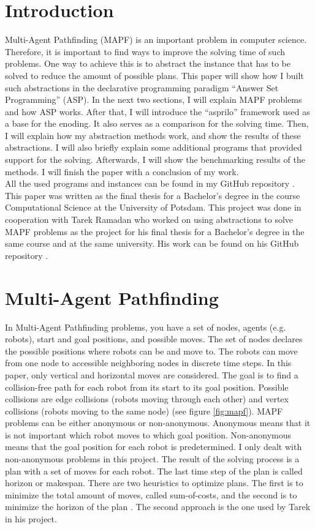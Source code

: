 \documentclass[runningheads]{llncs}
\begin{document}
\section{Introduction}
Multi-Agent Pathfinding (MAPF) is an important problem in computer science. Therefore, it is important to find ways to improve the solving time of such problems. One way to achieve this is to abstract the instance that has to be solved to reduce the amount of
possible plans. This paper will show how I built such abstractions in the declarative programming paradigm ``Answer Set Programming'' (ASP). In the next two sections, I will explain MAPF problems and how ASP works. After that, I will introduce the ``asprilo'' framework used as a base for the enoding. It also serves as a comparison for the solving time. Then, I will explain how my abstraction methods work, and show the results of these abstractions. I will also briefly explain some additional programs that provided support for the solving. Afterwards, I will show the benchmarking results of the methods. I will finish the paper with a conclusion of my work. \\
All the used programs and instances can be found in my GitHub repository \cite{my-git}. This paper was written as the final thesis for a Bachelor's degree in the course Computational Science at the University of Potsdam. This project was done in cooperation with Tarek Ramadan who worked on using abstractions to solve MAPF problems as the project for his final thesis for a Bachelor's degree in the same course and at the same university. His work can be found on his GitHub repository \cite{tarek-git}.

\section{Multi-Agent Pathfinding}
In Multi-Agent Pathfinding problems, you have a set of nodes, agents (e.g. robots), start and goal positions, and possible moves. The set of nodes declares the possible positions where robots can be and move to. The robots can move from one node to accessible neighboring nodes in discrete time steps. In this paper, only vertical and horizontal moves are considered. The goal is to find a collision-free path for each robot from its start to its goal position. Possible collisions are edge collisions (robots moving through each other) and vertex collisions (robots moving to the same node) (see figure \ref{fig:mapf}). MAPF problems can be either anonymous or non-anonymous. Anonymous means that it is not important which robot moves to which goal position. Non-anonymous means that the goal position for each robot is predetermined.  I only dealt with non-anonymous problems in this project. The result of the solving process is a plan with a set of moves for each robot. The last time step of the plan is called horizon or makespan. There are two heuristics to optimize plans. The first is to minimize the total amount of moves, called sum-of-costs, and the second is to minimize the horizon of the plan \cite{mapf}. The second approach is the one used by Tarek in his project.
\end{document}
